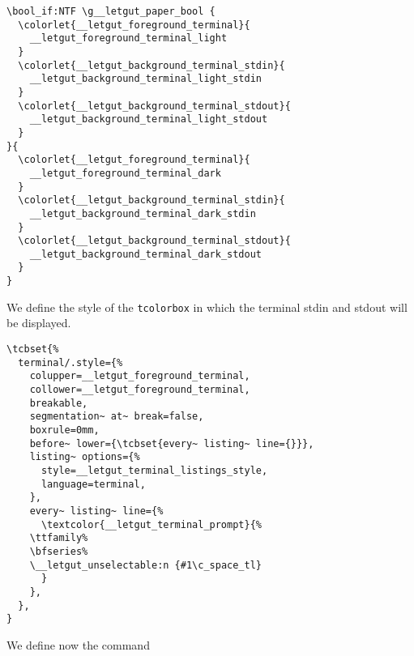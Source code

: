 \documentclass{letgut}
\begin{document}
\begin{lstlisting}
\bool_if:NTF \g__letgut_paper_bool {
  \colorlet{__letgut_foreground_terminal}{
    __letgut_foreground_terminal_light
  }
  \colorlet{__letgut_background_terminal_stdin}{
    __letgut_background_terminal_light_stdin
  }
  \colorlet{__letgut_background_terminal_stdout}{
    __letgut_background_terminal_light_stdout
  }
}{
  \colorlet{__letgut_foreground_terminal}{
    __letgut_foreground_terminal_dark
  }
  \colorlet{__letgut_background_terminal_stdin}{
    __letgut_background_terminal_dark_stdin
  }
  \colorlet{__letgut_background_terminal_stdout}{
    __letgut_background_terminal_dark_stdout
  }
}
\end{lstlisting}

We define the style of the \lstinline+tcolorbox+ in which the terminal stdin and stdout
will be displayed.

\begin{lstlisting}
\tcbset{%
  terminal/.style={%
    colupper=__letgut_foreground_terminal,
    collower=__letgut_foreground_terminal,
    breakable,
    segmentation~ at~ break=false,
    boxrule=0mm,
    before~ lower={\tcbset{every~ listing~ line={}}},
    listing~ options={%
      style=__letgut_terminal_listings_style,
      language=terminal,
    },
    every~ listing~ line={%
      \textcolor{__letgut_terminal_prompt}{%
	\ttfamily%
	\bfseries%
	\__letgut_unselectable:n {#1\c_space_tl}
      }
    },
  },
}
\end{lstlisting}

We define now the command
\end{document}
